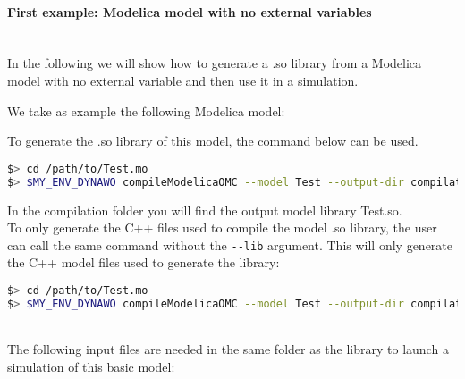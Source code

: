 \documentclass[a4paper, 12pt]{report}
\begin{document}
\paragraph{First example: Modelica model with no external variables}
~~\\
In the following we will show how to generate a .so library from a
Modelica model with no external variable and then use it in a \Dynawo
simulation. 

We take as example the following Modelica model:

To generate the .so library of this model, the command below can be
used. \\

\begin{lstlisting}[language=bash,deletekeywords={jobs,help}]
$> cd /path/to/Test.mo
$> $MY_ENV_DYNAWO compileModelicaOMC --model Test --output-dir compilation --input-dir . --lib Test.so
\end{lstlisting}

In the compilation folder you will find the output model library Test.so. \\

To only generate the C++ files used to compile the model .so library, the user can call the same command without the \lstinline[language=bash]{--lib} argument.
This will only generate the C++ model files used to generate the library:
\begin{lstlisting}[language=bash,deletekeywords={jobs,help}]
$> cd /path/to/Test.mo
$> $MY_ENV_DYNAWO compileModelicaOMC --model Test --output-dir compilation  --input-dir .
\end{lstlisting}

~~\\
The following input files are needed in the same folder as the library to launch a \Dynawo simulation of this basic model:





\end{document}
